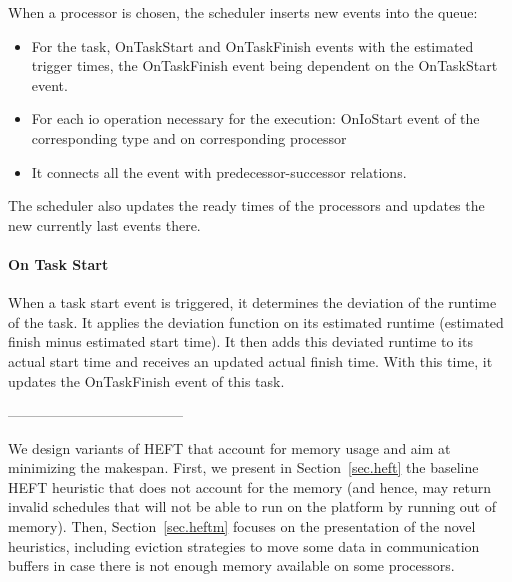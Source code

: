 \documentclass[conference]{IEEEtran}
\begin{document}
    When a processor is chosen, the scheduler inserts new events into the queue:
    \begin{itemize}
        \item For the task, OnTaskStart and OnTaskFinish events with the estimated trigger times, the OnTaskFinish event being dependent on the OnTaskStart event.
        \item For each io operation necessary for the execution: OnIoStart event of the corresponding type and on corresponding processor
        \item It connects all the event with predecessor-successor relations.
    \end{itemize}
    The scheduler also updates the ready times of the processors and updates the new currently last events there.

    \paragraph{On Task Start}
    When a task start event is triggered, it determines the deviation of the runtime of the task.
    It applies the deviation function on its estimated runtime (estimated finish minus estimated start time).
    It then adds this deviated runtime to its actual start time and receives an updated actual finish time.
    With this time, it updates the OnTaskFinish event of this task.



--------------------------------------



We design 
variants of HEFT that account for memory usage and aim at minimizing the makespan.
First, we present in Section~\ref{sec.heft} the baseline HEFT heuristic that does not account for the memory
(and hence, may return invalid schedules that will not be able to run on the platform
by running out of memory).  Then, Section~\ref{sec.heftm} focuses on the presentation of the novel
heuristics, including eviction strategies to move some data in communication buffers
in case there is not enough memory available on some processors.
\end{document}
